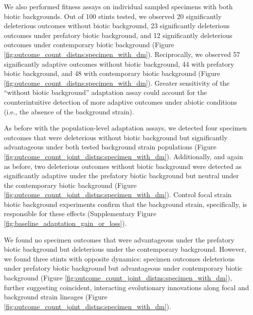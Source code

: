 We also performed fitness assays on individual sampled specimens with both biotic backgrounds.
Out of 100 stints tested, we observed 20 significantly deleterious outcomes without biotic background, 23 significantly deleterious outcomes under prefatory biotic background, and 12 significantly deleterious outcomes under contemporary biotic background (Figure \ref{fig:outcome_count_distns:specimen_with_dm}).
Reciprocally, we observed 57 significantly adaptive outcomes without biotic background, 44 with prefatory biotic background, and 48 with contemporary biotic background (Figure \ref{fig:outcome_count_distns:specimen_with_dm}).
Greater sensitivity of the ``without biotic background'' adaptation assay could account for the counterintuitive detection of more adaptive outcomes under abiotic conditions (i.e., the absence of the background strain).

As before with the population-level adaptation assays, we detected four specimen outcomes that were deleterious without biotic background but significantly advantageous under both tested background strain populations (Figure \ref{fig:outcome_count_joint_distns:specimen_with_dm}).
Additionally, and again as before, two deleterious outcomes without biotic background were detected as significantly adaptive under the prefatory biotic background but neutral under the contemporary biotic background (Figure \ref{fig:outcome_count_joint_distns:specimen_with_dm}).
Control focal strain biotic background experiments confirm that the background strain, specifically, is responsible for these effects (Supplementary Figure \ref{fig:baseline_adaptation_gain_or_loss}).

We found no specimen outcomes that were advantageous under the prefatory biotic background but deleterious under the contemporary background.
However, we found three stints with opposite dynamics: specimen outcomes deleterious under prefatory biotic background but advantageous under contemporary biotic background (Figure \ref{fig:outcome_count_joint_distns:specimen_with_dm}), further suggesting coincident, interacting evolutionary innovations along focal and background strain lineages (Figure \ref{fig:outcome_count_joint_distns:specimen_with_dm}).



